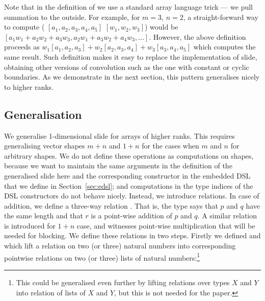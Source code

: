 Note that in the definition of  we use a standard array language
trick --- we pull summation to the outside.  For example, for $m = 3$, $n = 2$,
a straight-forward way to compute ( $[a_1, a_2, a_3, a_4, a_5]$
$[w_1, w_2, w_3]$) would be $[a_1w_1 + a_2w_2 + a_3w_3, a_2w_1 + a_3w_2 +
a_4w_3,\dots]$.  However, the above definition proceeds as $w_1[a_1,a_2,a_3] +
w_2[a_2,a_3,a_4] + w_3[a_3,a_4,a_5]$ which computes the same result.  Such
definition makes it easy to replace the implementation of slide, obtaining
other versions of convolution such as the one with constant or cyclic
boundaries.  As we demonstrate in the next section, this pattern generalises
nicely to higher ranks.



\subsection{Generalisation\label{sec:general-ix-ops}}
We generalise 1-dimensional slide for arrays of higher ranks.
This requires generalising vector shapes $m + n$ and $1 + n$ for the cases
when $m$ and $n$ for arbitrary shapes.  
We do not define these operations as computations on shapes, because
we want to maintain the same arguments in the definition of the
generalised slide here and the corresponding constructor in the
embedded DSL that we define in Section~\ref{sec:edsl}; and computations
in the type indices of the DSL constructors do not behave nicely.
Instead, we introduce relations.  In case of addition, we define a three-way
relation .  That is, the type  \AF{+}   
says that
$p$ and $q$ have the same length and that $r$ is a point-wise addition
of $p$ and $q$.  A similar relation  is introduced for $1 + n$
case, and  witnesses point-wise
multiplication that will be needed for blocking.  We define these relations
in two steps.  
Firstly we defined  and  which lift a relation on
two (or three) natural numbers into corresponding pointwise relations on
two (or three) lists of natural numbers:\footnote{
This could be generalised even further by lifting relations over
types $X$ and $Y$ into relation of lists of $X$ and $Y$, but this
is not needed for the paper.}
